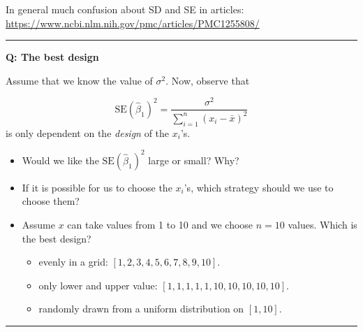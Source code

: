 \documentclass[]{article}
\providecommand{\tightlist}{%
  \setlength{\itemsep}{0pt}\setlength{\parskip}{0pt}}
\begin{document}
In general much confusion about SD and SE in articles:
\url{https://www.ncbi.nlm.nih.gov/pmc/articles/PMC1255808/}

\begin{center}\rule{0.5\linewidth}{\linethickness}\end{center}

\textbf{Q: The best design}

Assume that we know the value of \(\sigma^2\). Now, observe that

\[\text{SE}(\hat{\beta}_1)^2 = \frac{\sigma^2}{\sum_{i=1}^n (x_i-\bar{x})^2}\]
is only dependent on the \emph{design} of the \(x_i\)'s.

\begin{itemize}
\tightlist
\item
  Would we like the \(\text{SE}(\hat{\beta}_1)^2\) large or small? Why?
\item
  If it is possible for us to choose the \(x_i\)'s, which strategy
  should we use to choose them?
\item
  Assume \(x\) can take values from 1 to 10 and we choose \(n=10\)
  values. Which is the best design?

  \begin{itemize}
  \tightlist
  \item
    evenly in a grid: \([1,2,3,4,5,6,7,8,9,10]\).
  \item
    only lower and upper value: \([1,1,1,1,1,10,10,10,10,10]\).
  \item
    randomly drawn from a uniform distribution on \([1,10]\).
  \end{itemize}
\end{itemize}

\begin{center}\rule{0.5\linewidth}{\linethickness}\end{center}
\end{document}
